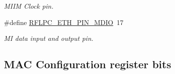 \begin{DoxyCompactItemize}
\begin{DoxyCompactList}\small\item\em M\-I\-I\-M Clock pin. \end{DoxyCompactList}\item 
\hypertarget{group__eth_ga1f0d688d33bfbc98a8e88b627896c5ae}{\#define \hyperlink{group__eth_ga1f0d688d33bfbc98a8e88b627896c5ae}{R\-F\-L\-P\-C\-\_\-\-E\-T\-H\-\_\-\-P\-I\-N\-\_\-\-M\-D\-I\-O}~17}\label{group__eth_ga1f0d688d33bfbc98a8e88b627896c5ae}

\begin{DoxyCompactList}\small\item\em M\-I data input and output pin. \end{DoxyCompactList}\end{DoxyCompactItemize}
\subsection*{M\-A\-C Configuration register bits}
